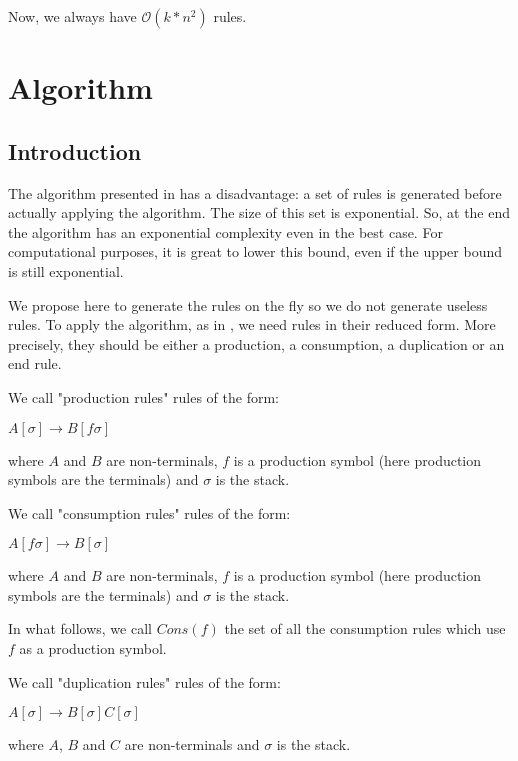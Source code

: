 \documentclass[10pt,a4paper,draft]{article}
\begin{document}
Now, we always have $\mathcal{O}(k * n^2)$ rules.

\section{Algorithm}

\subsection{Introduction}
\label{introAlgo}

The algorithm presented in \cite{aho68} has a disadvantage: a set of rules is generated before actually applying the algorithm. The size of this set is exponential. So, at the end the algorithm has an exponential complexity even in the best case. For computational purposes, it is great to lower this bound, even if the upper bound is still exponential.

We propose here to generate the rules on the fly so we do not generate useless rules. To apply the algorithm, as in \cite{aho68}, we need rules in their reduced form. More precisely, they should be either a production, a consumption, a duplication or an end rule.

\begin{definition}
We call "production rules" rules of the form:

$A[\sigma] \rightarrow B[f \sigma]$

where $A$ and $B$ are non-terminals, $f$ is a production symbol (here production symbols are the terminals) and $\sigma$ is the stack.
\end{definition}

\begin{definition}
We call "consumption rules" rules of the form:

$A[f \sigma] \rightarrow B[\sigma]$

where $A$ and $B$ are non-terminals, $f$ is a production symbol (here production symbols are the terminals) and $\sigma$ is the stack.

In what follows, we call $Cons(f)$ the set of all the consumption rules which use $f$ as a production symbol.
\end{definition}

\begin{definition}
We call "duplication rules" rules of the form:

$A[\sigma] \rightarrow B[\sigma] C[\sigma]$

where $A$, $B$ and $C$ are non-terminals and $\sigma$ is the stack.
\end{definition}
\end{document}
